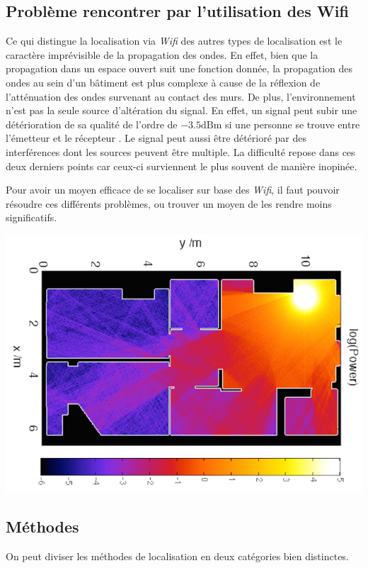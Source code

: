 \documentclass[11pt,journal,compsoc]{IEEEtran}
\newcommand{\dBm}{\text{dBm}}
\begin{document}
  \subsection{Problème rencontrer par l'utilisation des Wifi}
    Ce qui distingue la localisation via \textit{Wifi} des autres types de localisation est le caractère imprévisible de la propagation des ondes.
	En effet, bien que la propagation dans un espace ouvert suit une fonction donnée, la propagation des ondes au sein d'un bâtiment est plus complexe
	à cause de la réflexion de l'atténuation des ondes survenant au contact des murs. De plus, l'environnement n'est pas la seule source d'altération
	du signal. En effet, un signal peut subir une détérioration de sa qualité de l'ordre de $-3.5 \dBm$ si une personne se trouve entre l'émetteur et le
	récepteur \cite{ETH}. Le signal peut aussi être détérioré par des interférences dont les sources peuvent être multiple. La difficulté repose dans
	ces deux derniers points car ceux-ci surviennent le plus souvent de manière inopinée.

    Pour avoir un moyen efficace de se localiser sur base des \textit{Wifi}, il faut pouvoir résoudre ces différents problèmes, ou trouver un moyen de
	les rendre moins significatifs.
    \begin{center}
      \includegraphics[scale=0.3]{images/wifi-propagation.png}
    \end{center}
  \subsection{Méthodes}
    On peut diviser les méthodes de localisation en deux catégories bien distinctes.
\end{document}
